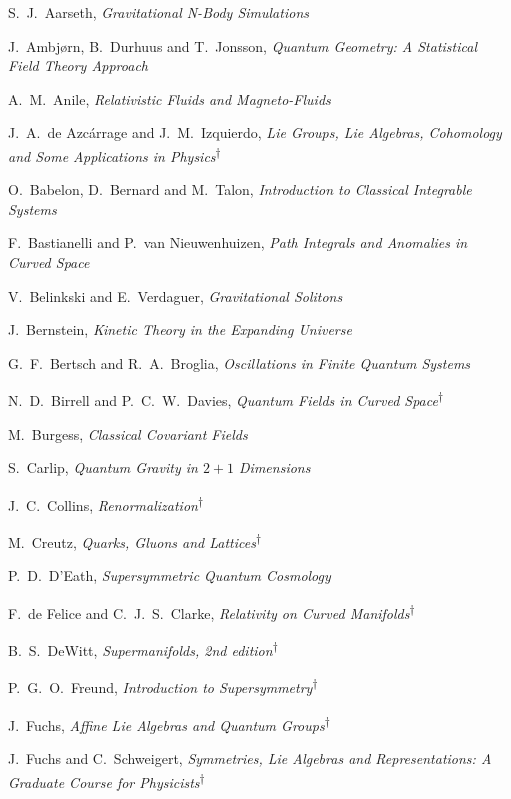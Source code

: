 \begin{list}{}{\setlength{\leftmargin}{0pt}\setlength{\rightmargin}{0pt}
\setlength{\itemsep}{2pt}\setlength{\parsep}{0pt}}
\item S.~J.~Aarseth, \emph{Gravitational N-Body Simulations}
\item J.~Ambjørn, B.~Durhuus and T.~Jonsson, \emph{Quantum Geometry: A Statistical Field Theory Approach}
\item A.~M.~Anile, \emph{Relativistic Fluids and Magneto-Fluids}
\item J.~A.~de Azcárrage and J.~M.~Izquierdo, \emph{Lie Groups, Lie Algebras, Cohomology and Some Applications in Physics}\textsuperscript{\(\dagger\)}
\item O.~Babelon, D.~Bernard and M.~Talon, \emph{Introduction to Classical Integrable Systems}
\item F.~Bastianelli and P.~van Nieuwenhuizen, \emph{Path Integrals and Anomalies in Curved Space}
\item V.~Belinkski and E.~Verdaguer, \emph{Gravitational Solitons}
\item J.~Bernstein, \emph{Kinetic Theory in the Expanding Universe}
\item G.~F.~Bertsch and R.~A.~Broglia, \emph{Oscillations in Finite Quantum Systems}
\item N.~D.~Birrell and P.~C.~W.~Davies, \emph{Quantum Fields in Curved Space}\textsuperscript{\(\dagger\)}
\item M.~Burgess, \emph{Classical Covariant Fields}
\item S.~Carlip, \emph{Quantum Gravity in \(2+1\) Dimensions}
\item J.~C.~Collins, \emph{Renormalization}\textsuperscript{\(\dagger\)}
\item M.~Creutz, \emph{Quarks, Gluons and Lattices}\textsuperscript{\(\dagger\)}
\item P.~D.~D'Eath, \emph{Supersymmetric Quantum Cosmology}
\item F.~de Felice and C.~J.~S.~Clarke, \emph{Relativity on Curved Manifolds}\textsuperscript{\(\dagger\)}
\item B.~S.~DeWitt, \emph{Supermanifolds, 2nd edition}\textsuperscript{\(\dagger\)}
\item P.~G.~O.~Freund, \emph{Introduction to Supersymmetry}\textsuperscript{\(\dagger\)}
\item J.~Fuchs, \emph{Affine Lie Algebras and Quantum Groups}\textsuperscript{\(\dagger\)}
\item J.~Fuchs and C.~Schweigert, \emph{Symmetries, Lie Algebras and Representations: A Graduate Course for Physicists}\textsuperscript{\(\dagger\)}

\end{list}

